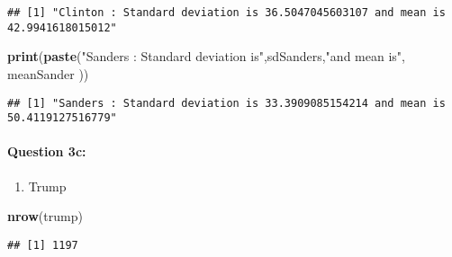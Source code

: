 \documentclass[
]{article}
\newenvironment{Shaded}{\begin{snugshade}}{\end{snugshade}}
\newcommand{\CommentTok}[1]{\textcolor[rgb]{0.56,0.35,0.01}{\textit{#1}}}
\newcommand{\DecValTok}[1]{\textcolor[rgb]{0.00,0.00,0.81}{#1}}
\newcommand{\FloatTok}[1]{\textcolor[rgb]{0.00,0.00,0.81}{#1}}
\newcommand{\FunctionTok}[1]{\textcolor[rgb]{0.13,0.29,0.53}{\textbf{#1}}}
\newcommand{\NormalTok}[1]{#1}
\newcommand{\OtherTok}[1]{\textcolor[rgb]{0.56,0.35,0.01}{#1}}
\newcommand{\SpecialCharTok}[1]{\textcolor[rgb]{0.81,0.36,0.00}{\textbf{#1}}}
\newcommand{\StringTok}[1]{\textcolor[rgb]{0.31,0.60,0.02}{#1}}
\providecommand{\tightlist}{%
  \setlength{\itemsep}{0pt}\setlength{\parskip}{0pt}}
\begin{document}
\begin{verbatim}
## [1] "Clinton : Standard deviation is 36.5047045603107 and mean is 42.9941618015012"
\end{verbatim}

\begin{Shaded}
\begin{Highlighting}[]
\FunctionTok{print}\NormalTok{(}\FunctionTok{paste}\NormalTok{(}\StringTok{"Sanders : Standard deviation is"}\NormalTok{,sdSanders,}\StringTok{"and mean is"}\NormalTok{, meanSander ))}
\end{Highlighting}
\end{Shaded}

\begin{verbatim}
## [1] "Sanders : Standard deviation is 33.3909085154214 and mean is 50.4119127516779"
\end{verbatim}

\hypertarget{question-3c}{%
\paragraph{Question 3c:}\label{question-3c}}

\begin{enumerate}
\def\labelenumi{\roman{enumi}.}
\tightlist
\item
  Trump
\end{enumerate}

\begin{Shaded}
\begin{Highlighting}[]
\FunctionTok{nrow}\NormalTok{(trump)}
\end{Highlighting}
\end{Shaded}

\begin{verbatim}
## [1] 1197
\end{verbatim}

\begin{Shaded}
\end{Shaded}
\end{document}
